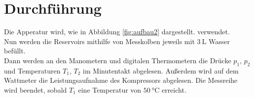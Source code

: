 \section{Durchführung}
\label{sec:Durchführung}
Die Apperatur wird, wie in Abbildung \ref{fig:aufbau2} dargestellt. verwendet.\\
Nun werden die Reservoirs mithilfe von Messkolben jeweils mit $\SI{3}{\liter}$ Wasser befüllt.\\
Dann werden an den Manometern und digitalen Thermometern die Drücke $p_1$, $p_2$ und Temperaturen
$T_1$, $T_2$ im Minutentakt abgelesen. Außerdem wird auf dem Wattmeter die Leistungsaufnahme des Kompressors abgelesen.
Die Messreihe wird beendet, sobald $T_1$ eine Temperatur von $\SI{50}{\celsius}$ erreicht.